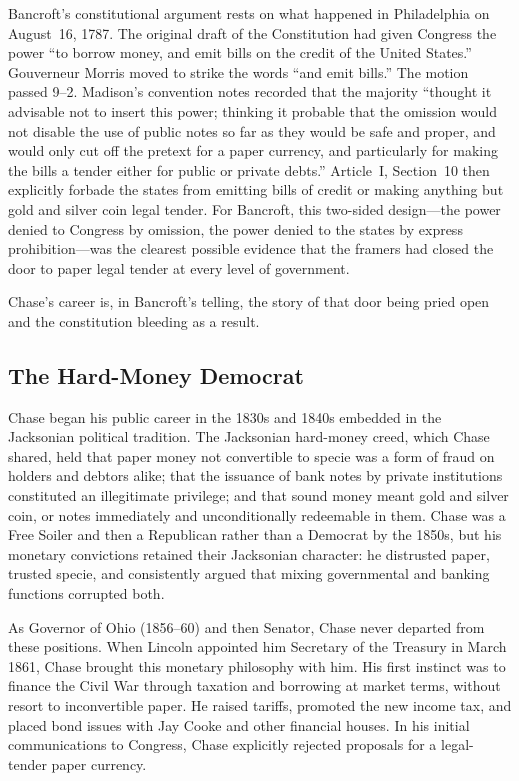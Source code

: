 \documentclass[12pt]{article}
\begin{document}
Bancroft's constitutional argument rests on what happened in Philadelphia
on August~16, 1787.  The original draft of the Constitution had given
Congress the power ``to borrow money, and emit bills on the credit of
the United States.''  Gouverneur Morris moved to strike the words ``and
emit bills.''  The motion passed 9--2.  Madison's convention notes
recorded that the majority ``thought it advisable not to insert this
power; thinking it probable that the omission would not disable the use
of public notes so far as they would be safe and proper, and would only
cut off the pretext for a paper currency, and particularly for making
the bills a tender either for public or private debts.''  Article~I,
Section~10 then explicitly forbade the states from emitting bills of
credit or making anything but gold and silver coin legal tender.  For
Bancroft, this two-sided design---the power denied to Congress by
omission, the power denied to the states by express prohibition---was
the clearest possible evidence that the framers had closed the door to
paper legal tender at every level of government.

Chase's career is, in Bancroft's telling, the story of that door being
pried open and the constitution bleeding as a result.

\subsection{The Hard-Money Democrat}

Chase began his public career in the 1830s and 1840s embedded in the
Jacksonian political tradition.  The Jacksonian hard-money creed, which
Chase shared, held that paper money not convertible to specie was a
form of fraud on holders and debtors alike; that the issuance of bank
notes by private institutions constituted an illegitimate privilege; and
that sound money meant gold and silver coin, or notes immediately and
unconditionally redeemable in them.  Chase was a Free Soiler and then a
Republican rather than a Democrat by the 1850s, but his monetary
convictions retained their Jacksonian character: he distrusted paper,
trusted specie, and consistently argued that mixing governmental and
banking functions corrupted both.

As Governor of Ohio (1856--60) and then Senator, Chase never departed
from these positions.  When Lincoln appointed him Secretary of the
Treasury in March 1861, Chase brought this monetary philosophy with him.
His first instinct was to finance the Civil War through taxation and
borrowing at market terms, without resort to inconvertible paper.  He
raised tariffs, promoted the new income tax, and placed bond issues
with Jay Cooke and other financial houses.  In his initial
communications to Congress, Chase explicitly rejected proposals for a
legal-tender paper currency.
\end{document}

